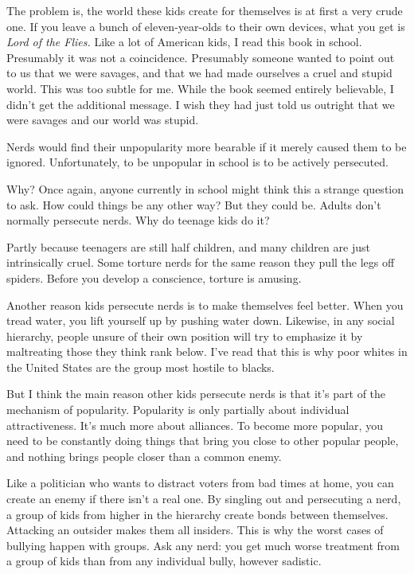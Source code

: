 \documentclass[12pt]{book}
\begin{document}
The problem is, the world these kids create for themselves is at first a
very crude one. If you leave a bunch of eleven-year-olds to their own
devices, what you get is \emph{Lord of the Flies.} Like a lot of
American kids, I read this book in school. Presumably it was not a
coincidence. Presumably someone wanted to point out to us that we were
savages, and that we had made ourselves a cruel and stupid world. This
was too subtle for me. While the book seemed entirely believable, I
didn't get the additional message. I wish they had just told us outright
that we were savages and our world was stupid.

Nerds would find their unpopularity more bearable if it merely caused
them to be ignored. Unfortunately, to be unpopular in school is to be
actively persecuted.

Why? Once again, anyone currently in school might think this a strange
question to ask. How could things be any other way? But they could be.
Adults don't normally persecute nerds. Why do teenage kids do it?

Partly because teenagers are still half children, and many children are
just intrinsically cruel. Some torture nerds for the same reason they
pull the legs off spiders. Before you develop a conscience, torture is
amusing.

Another reason kids persecute nerds is to make themselves feel better.
When you tread water, you lift yourself up by pushing water down.
Likewise, in any social hierarchy, people unsure of their own position
will try to emphasize it by maltreating those they think rank below.
I've read that this is why poor whites in the United States are the
group most hostile to blacks.

But I think the main reason other kids persecute nerds is that it's part
of the mechanism of popularity. Popularity is only partially about
individual attractiveness. It's much more about alliances. To become
more popular, you need to be constantly doing things that bring you
close to other popular people, and nothing brings people closer than a
common enemy.

Like a politician who wants to distract voters from bad times at home,
you can create an enemy if there isn't a real one. By singling out and
persecuting a nerd, a group of kids from higher in the hierarchy create
bonds between themselves. Attacking an outsider makes them all insiders.
This is why the worst cases of bullying happen with groups. Ask any
nerd: you get much worse treatment from a group of kids than from any
individual bully, however sadistic.
\end{document}
